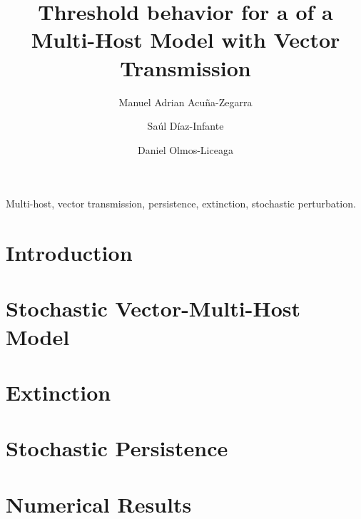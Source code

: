 \documentclass[3p,sort&compress,times]{elsarticle}
\DeclareRobustCommand{\1}[1]{\ensuremath \mathbbm{1}_{\{#1\}}}
\begin{document}
	\begin{frontmatter}
		\title{
			Threshold behavior for a of a Multi-Host Model with Vector Transmission
		}
		\author[add:unison]{%
			Manuel Adrian Acu\~na-Zegarra
		}%
		\author[add:conacyt_unison]{%
			Sa\'ul D\'iaz-Infante
		}%
		\author[add:unison]{Daniel Olmos-Liceaga}
		\address[add:unison]{
			Departamento de Matem\'aticas, Universidad de Sonora, Boulevard
			Luis Encinas y Rosales S/N, Col. Centro, Hermosillo, Sonora, 
			M\'exico.
		}
		\address[add:conacyt_unison]{
			CONACYT-Universidad de Sonora, 
			Departamento de Matem\'aticas, Boulevard Luis Encinas y 
			Rosales S/N, 83000, Hermosillo, Sonora, M\'exico.
		}
		\begin{abstract}
		\end{abstract}
		\begin{keyword}
			Multi-host,
			vector transmission,
			persistence,
			extinction,
			stochastic 
			perturbation.
		\end{keyword}
	\end{frontmatter}
	\section{Introduction}
	\section{
		Stochastic Vector-Multi-Host 
		Model
	}\label{sec:StochasticMultiHostModel}
	\section{
		Extinction
	}\label{sec:Extinction}
	\section{Stochastic Persistence}\label{sec:Persistence}
	\section{Numerical Results}\label{sec:NumericalResults}
\end{document}

